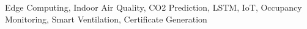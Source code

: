 \documentclass[conference]{IEEEtran}
\begin{document}
\begin{IEEEkeywords}
Edge Computing, Indoor Air Quality, CO2 Prediction, LSTM, IoT, Occupancy Monitoring, Smart Ventilation, Certificate Generation
\end{IEEEkeywords}










\end{document}
